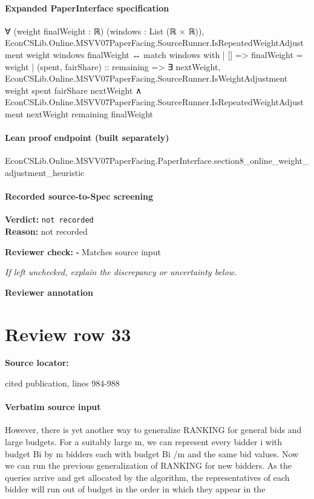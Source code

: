 \documentclass[10pt]{article}
\newcommand{\reviewerbox}{%
  \par\noindent\fbox{\parbox{0.96\linewidth}{\rule{0pt}{0.38in}}}\par
}
\newcommand{\reviewmatch}[1]{%
  \par\noindent\textbf{Reviewer check:} $\square$\; #1\par
  \noindent\emph{If left unchecked, explain the discrepancy or uncertainty below.}\par
}
\begin{document}
\paragraph{Expanded PaperInterface specification}
\begin{ReviewVerbatim}
∀ (weight finalWeight : ℝ) (windows : List (ℝ × ℝ)),
  EconCSLib.Online.MSVV07PaperFacing.SourceRunner.IsRepeatedWeightAdjustment weight windows finalWeight ↔
    match windows with
    | [] => finalWeight = weight
    | (spent, fairShare) :: remaining =>
      ∃ nextWeight,
        EconCSLib.Online.MSVV07PaperFacing.SourceRunner.IsWeightAdjustment weight spent fairShare nextWeight ∧
          EconCSLib.Online.MSVV07PaperFacing.SourceRunner.IsRepeatedWeightAdjustment nextWeight remaining finalWeight
\end{ReviewVerbatim}

\paragraph{Lean proof endpoint (built separately)}\begin{ReviewVerbatim}
EconCSLib.Online.MSVV07PaperFacing.PaperInterface.section8_online_weight_adjustment_heuristic
\end{ReviewVerbatim}

\paragraph{Recorded source-to-Spec screening}
\textbf{Verdict:} \texttt{not recorded}
\\
\textbf{Reason:} not recorded
\reviewmatch{Matches source input}
\noindent\textbf{Reviewer annotation}\par
\reviewerbox
\clearpage
\hypertarget{source-claim-3800151672c640cc}{}
\section*{Review row 33}
\textbf{Source locator:} {\footnotesize\raggedright cited publication, lines 984-\allowbreak{}988\par}
\paragraph{Verbatim source input}
\begin{ReviewVerbatim}
However, there is yet another way to generalize RANKING for general bids and large budgets.
For a suitably large m, we can represent every bidder i with budget Bi by m bidders each
with budget Bi /m and the same bid values. Now we can run the previous generalization of
RANKING for new bidders. As the queries arrive and get allocated by the algorithm, the
representatives of each bidder will run out of budget in the order in which they appear in the
\end{ReviewVerbatim}
\end{document}
